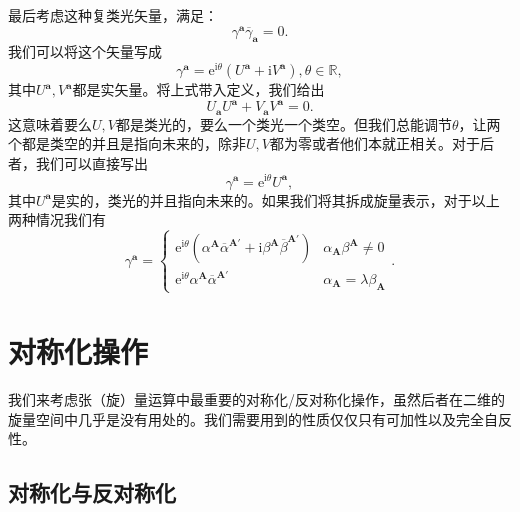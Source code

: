 最后考虑这种复类光矢量，满足：
\begin{equation*}
	\gamma ^{\boldsymbol{a}}\overline{\gamma }_{\boldsymbol{a}} =0.
\end{equation*}
我们可以将这个矢量写成
\begin{equation*}
	\gamma ^{\boldsymbol{a}} =\mathrm{e}^{\mathrm{i} \theta } (U^{\boldsymbol{a}} +\mathrm{i} V^{\boldsymbol{a}} ),\theta \in \mathbb{R} ,
\end{equation*}
其中$U^{\boldsymbol{a}} ,V^{\boldsymbol{a}}$都是实矢量。将上式带入定义，我们给出
\begin{equation*}
	U_{\boldsymbol{a}} U^{\boldsymbol{a}} +V_{\boldsymbol{a}} V^{\boldsymbol{a}} =0.
\end{equation*}
这意味着要么$U,V$都是类光的，要么一个类光一个类空。但我们总能调节$\theta $，让两个都是类空的并且是指向未来的，除非$U,V$都为零或者他们本就正相关。对于后者，我们可以直接写出
\begin{equation*}
	\gamma ^{\boldsymbol{a}} =\mathrm{e}^{\mathrm{i} \theta } U^{\boldsymbol{a}} ,
\end{equation*}
其中$U^{\boldsymbol{a}}$是实的，类光的并且指向未来的。如果我们将其拆成旋量表示，对于以上两种情况我们有
\begin{equation*}
	\gamma ^{\boldsymbol{a}} =\begin{cases}
		\mathrm{e}^{\mathrm{i} \theta } (\alpha ^{\boldsymbol{A}}\overline{\alpha }^{\boldsymbol{A} '} +\mathrm{i} \beta ^{\boldsymbol{A}}\overline{\beta }^{\boldsymbol{A} '} ) & \alpha _{\boldsymbol{A}} \beta ^{\boldsymbol{A}} \neq 0\\
		\mathrm{e}^{\mathrm{i} \theta } \alpha ^{\boldsymbol{A}}\overline{\alpha }^{\boldsymbol{A} '} & \alpha _{\boldsymbol{A}} =\lambda \beta _{\boldsymbol{A}}
	\end{cases} .
\end{equation*}

\section{对称化操作}

我们来考虑张（旋）量运算中最重要的对称化/反对称化操作，虽然后者在二维的旋量空间中几乎是没有用处的。我们需要用到的性质仅仅只有可加性以及完全自反性。


\subsection{对称化与反对称化}

